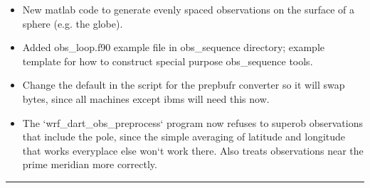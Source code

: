 \documentclass[letterpaper,10pt,english]{sphinxmanual}
\begin{document}
\begin{itemize}
\item {} 
New matlab code to generate evenly spaced observations on the
surface of a sphere (e.g. the globe).

\item {} 
Added obs\_loop.f90 example file in obs\_sequence directory; example
template for how to construct special purpose obs\_sequence tools.

\item {} 
Change the default in the script for the prepbufr converter so it
will swap bytes, since all machines except ibms will need this now.

\item {} 
The `wrf\_dart\_obs\_preprocess` program now refuses to superob
observations that include the pole, since the simple averaging of
latitude and longitude that works everyplace else won`t work there.
Also treats observations near the prime meridian more correctly.

\end{itemize}


\bigskip\hrule{}\bigskip
\end{document}

